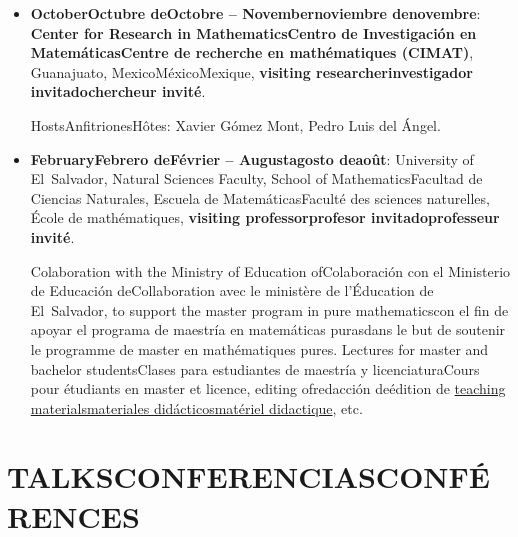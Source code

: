 \documentclass{article}
\newcommand{\biling}[3]{\ifdefined\english#1\fi\ifdefined\spanish#2\fi\ifdefined\french#3\fi}
\newcommand{\UES}{University of El~Salvador}
\newcommand{\UES}{Universidad de El~Salvador}
\newcommand{\UES}{Université de El~Salvador}
\begin{document}
\begin{itemize}
\item \textbf{\biling{October}{Octubre de}{Octobre} 2019 -- \biling{November}{noviembre de}{novembre} 2020}:
  \textbf{\biling{Center for Research in Mathematics}{Centro de Investigación en Matemáticas}{Centre de recherche en mathématiques} (CIMAT)},
  Guanajuato, \biling{Mexico}{México}{Mexique}, \textbf{\biling{visiting researcher}{investigador invitado}{chercheur invité}}.

  \biling{Hosts}{Anfitriones}{Hôtes}: Xavier Gómez Mont, Pedro Luis del Ángel.

\item \textbf{\biling{February}{Febrero de}{Février} 2018 -- \biling{August}{agosto de}{août} 2019}:
  \UES,
  \biling{Natural Sciences Faculty, School of Mathematics}{Facultad de Ciencias Naturales, Escuela de Matemáticas}{Faculté des sciences naturelles, École de mathématiques},
  \textbf{\biling{visiting professor}{profesor invitado}{professeur invité}}.

  \biling{Colaboration with the Ministry of Education of}{Colaboración con el Ministerio de Educación de}{Collaboration avec le ministère de l'Éducation de} El~Salvador,
  \biling{to support the master program in pure mathematics}{con el fin de apoyar el programa de maestría en matemáticas puras}{dans le but de soutenir le programme de master en mathématiques pures}.
  \biling{Lectures for master and bachelor students}{Clases para estudiantes de maestría y licenciatura}{Cours pour étudiants en master et licence},
  \biling{editing of}{redacción de}{édition de}
  \href{https://cadadr.org/san-salvador/}{\biling{teaching materials}{materiales didácticos}{matériel didactique}}, etc.
\end{itemize}

{\color{RoyalBlue}\section*{\biling{TALKS}{CONFERENCIAS}{CONFÉRENCES}}}
\end{document}
